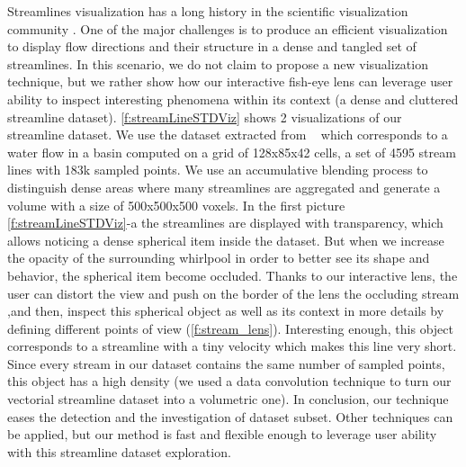 Streamlines visualization has a long history in the scientific visualization community \cite{brambilla2012illustrative}. One of the major challenges is to produce an efficient visualization to display flow directions and their structure in a dense and tangled set of streamlines. In this scenario, we do not claim to propose a new visualization technique, but we rather show how our interactive fish-eye lens can leverage user ability to inspect interesting phenomena within its context (a dense and cluttered streamline dataset). 
\autoref{f:streamLineSTDViz} shows 2 visualizations of our streamline dataset. We use the dataset extracted from  ~\cite{griebel2004flow} which corresponds to a water flow in a basin computed on a  grid of 128x85x42 cells, a set of 4595 stream lines with 183k sampled points. We use an accumulative blending process to distinguish dense areas where many streamlines are aggregated and generate a volume with a size of 500x500x500 voxels. In the first picture \autoref{f:streamLineSTDViz}-a the streamlines are displayed with transparency, which allows noticing a dense spherical item inside the dataset. But when we increase the opacity of the surrounding whirlpool in order to better see its shape and behavior, the spherical item become occluded.
Thanks to our interactive lens, the user can distort the view and push on the border of the lens the occluding stream ,and then, inspect this spherical object as well as its context in more details by defining different points of view (\autoref{f:stream_lens}).  Interesting enough, this object corresponds to a streamline with a tiny velocity which makes this line very short. Since every stream in our dataset contains the same number of sampled points, this object has a high density (we used a data convolution technique to turn our vectorial streamline dataset into a volumetric one). In conclusion, our technique eases the detection and the investigation of dataset subset. Other techniques can be applied, but our method is fast and flexible enough to leverage user ability with this streamline dataset exploration.




